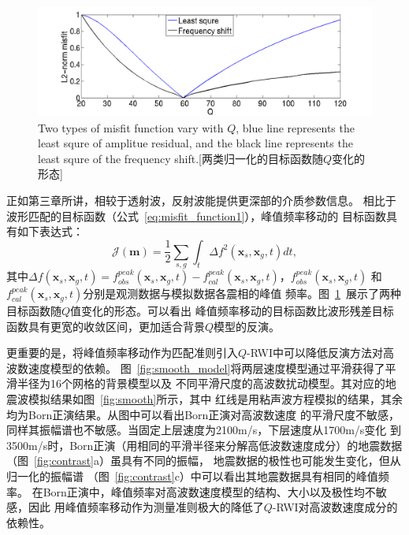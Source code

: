 \begin{figure}[!htbp]
    \centering
    {\includegraphics[width=0.92\linewidth]{figure/misfit_com}}
	{Two types of misfit function vary with $Q$, blue line represents the least 
	squre of amplitue residual, and the black line represents the least squre of 
	the frequency shift.}[两类归一化的目标函数随$Q$变化的形态]
    \label{fig:misfit_com}
\end{figure}
正如第三章所讲，相较于透射波，反射波能提供更深部的介质参数信息。
相比于波形匹配的目标函数（公式~\ref{eq:misfit_function1}），峰值频率移动的
目标函数具有如下表达式：
\begin{equation}
    \mathcal{J}(\mathbf{m})=\frac{1}{2}\sum_{s,g}\int_t\Delta f^2(\mathbf{x}_s,\mathbf{x}_g,t)dt,
    \label{eq:freq_misfit_function}
\end{equation}
其中$\Delta f(\mathbf{x}_s,\mathbf{x}_g,t)=f^{peak}_{obs}(\mathbf{x}_s,\mathbf{x}_g,t)-
f^{peak}_{cal}(\mathbf{x}_s,\mathbf{x}_g,t)$，$f^{peak}_{obs}(\mathbf{x}_s,\mathbf{x}_g,t)$
和$f^{peak}_{cal}(\mathbf{x}_s,\mathbf{x}_g,t)$分别是观测数据与模拟数据各震相的峰值
频率。图~\ref{fig:misfit_com}~展示了两种目标函数随$Q$值变化的形态。可以看出
峰值频率移动的目标函数比波形残差目标函数具有更宽的收敛区间，更加适合背景$Q$模型的反演。

更重要的是，将峰值频率移动作为匹配准则引入$Q$-RWI中可以降低反演方法对高波数速度模型的依赖。
图~\ref{fig:smooth_model}将两层速度模型通过平滑获得了平滑半径为16个网格的背景模型以及
不同平滑尺度的高波数扰动模型。其对应的地震波模拟结果如图~\ref{fig:smooth}所示，其中
红线是用粘声波方程模拟的结果，其余均为Born正演结果。从图中可以看出Born正演对高波数速度
的平滑尺度不敏感，同样其振幅谱也不敏感。当固定上层速度为2100m/s，下层速度从1700m/s变化
到3500m/s时，Born正演（用相同的平滑半径来分解高低波数速度成分）的地震数据
（图~\ref{fig:contrast}a）虽具有不同的振幅，
地震数据的极性也可能发生变化，但从归一化的振幅谱
（图~\ref{fig:contrast}c）中可以看出其地震数据具有相同的峰值频率。
在Born正演中，峰值频率对高波数速度模型的结构、大小以及极性均不敏感，因此
用峰值频率移动作为测量准则极大的降低了$Q$-RWI对高波数速度成分的依赖性。

